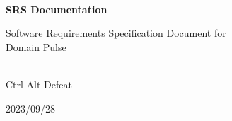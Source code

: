 \begin{titlepage}
    \centering



    \vspace{2cm}
    \hrulefill\\
    \vspace{1cm}
    {\Huge\bfseries SRS Documentation}

    \vspace{1cm}

    {\Large Software Requirements Specification Document for\\Domain Pulse}\\
    \vspace{1cm}
    \hrulefill\\

    \vfill

    {\large Ctrl Alt Defeat}

    \vspace{1cm}

    {\large 2023/09/28}\\

\end{titlepage}

